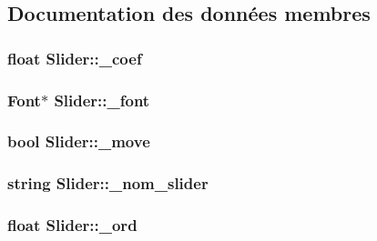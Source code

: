 \subsection{Documentation des données membres}
\hypertarget{classSlider_a63a07bf3bd7f8cde11563746a54b9d7b}{
\subsubsection[{\_\-coef}]{\setlength{\rightskip}{0pt plus 5cm}float {\bf Slider::\_\-coef}}}
\label{classSlider_a63a07bf3bd7f8cde11563746a54b9d7b}
\hypertarget{classSlider_a4e4996aa8b595c6b012d645af3f7c97d}{
\subsubsection[{\_\-font}]{\setlength{\rightskip}{0pt plus 5cm}Font$\ast$ {\bf Slider::\_\-font}}}
\label{classSlider_a4e4996aa8b595c6b012d645af3f7c97d}
\hypertarget{classSlider_a8b223411b6bc8db5b944da518667cb67}{
\subsubsection[{\_\-move}]{\setlength{\rightskip}{0pt plus 5cm}bool {\bf Slider::\_\-move}}}
\label{classSlider_a8b223411b6bc8db5b944da518667cb67}
\hypertarget{classSlider_aa809f4dfd9abb3219cd1c4608b62db0f}{
\subsubsection[{\_\-nom\_\-slider}]{\setlength{\rightskip}{0pt plus 5cm}string {\bf Slider::\_\-nom\_\-slider}}}
\label{classSlider_aa809f4dfd9abb3219cd1c4608b62db0f}
\hypertarget{classSlider_a9ef1ee931b3f1bdf217083125ed85f86}{
\subsubsection[{\_\-ord}]{\setlength{\rightskip}{0pt plus 5cm}float {\bf Slider::\_\-ord}}}
